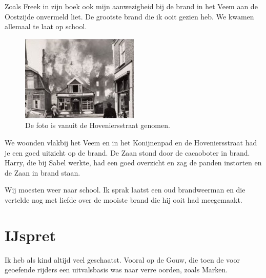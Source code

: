 \documentclass[12pt,twoside, openright]{memoir}
\begin{document}
Zoals Freek in zijn boek ook mijn aanwezigheid bij de brand in het Veem aan de Oostzijde onvermeld liet. De grootste brand die ik ooit gezien heb. We kwamen allemaal te laat op school. 

\begin{figure}
\includegraphics[width=\textwidth]{img/ch12/vuur}
\caption*{\footnotesize De foto is vanuit de Hoveniersstraat genomen.}
\end{figure}

We woonden vlakbij het Veem en in het Konijnenpad en de Hoveniersstraat had je een goed uitzicht op de brand. De Zaan stond door de cacaoboter in brand. Harry, die bij Sabel werkte, had een goed overzicht en zag de panden instorten en de Zaan in brand staan.

Wij moesten weer naar school. Ik sprak laatst een oud brandweerman en die vertelde nog met liefde over de mooiste brand die hij ooit had meegemaakt. 

\chapter{IJspret} %
\label{cha:ijspret}

Ik heb als kind altijd veel geschaatst. Vooral op de Gouw, die toen de voor geoefende rijders een uitvalsbasis was naar verre oorden, zoals Marken.
\end{document}

